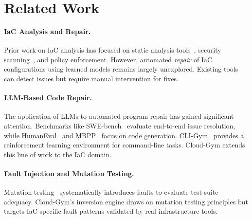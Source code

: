 \section{Related Work}
\label{sec:related_work}

\paragraph{IaC Analysis and Repair.}
Prior work on IaC analysis has focused on static analysis tools~\citep{cfnlint2023}, security scanning~\citep{checkov2023}, and policy enforcement. However, automated \emph{repair} of IaC configurations using learned models remains largely unexplored. Existing tools can detect issues but require manual intervention for fixes.

\paragraph{LLM-Based Code Repair.}
The application of LLMs to automated program repair has gained significant attention. Benchmarks like SWE-bench~\citep{jimenez2024swebench} evaluate end-to-end issue resolution, while HumanEval~\citep{chen2021codex} and MBPP~\citep{austin2021program} focus on code generation. CLI-Gym~\citep{cligym2024} provides a reinforcement learning environment for command-line tasks. Cloud-Gym extends this line of work to the IaC domain.

\paragraph{Fault Injection and Mutation Testing.}
Mutation testing~\citep{jia2011mutation} systematically introduces faults to evaluate test suite adequacy. Cloud-Gym's inversion engine draws on mutation testing principles but targets IaC-specific fault patterns validated by real infrastructure tools.

